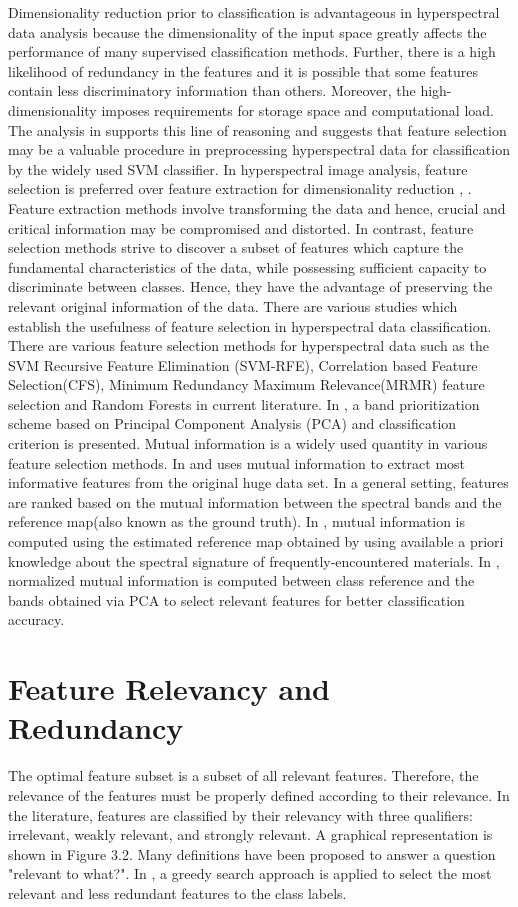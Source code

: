 \documentclass[document.tex]{subfiles}
\begin{document}
Dimensionality reduction prior to classification is advantageous in hyperspectral data
analysis because the dimensionality of the input space greatly affects the performance of
many supervised classification methods\cite{13}. Further, there is a high likelihood of redundancy in the features and it is possible that some features contain less discriminatory
information than others. Moreover, the high-dimensionality imposes requirements for
storage space and computational load. The analysis in \cite{1} supports this line of reasoning
and suggests that feature selection may be a valuable procedure in preprocessing hyperspectral data for classification by the widely used SVM classifier. In hyperspectral
image analysis, feature selection is preferred over feature extraction for dimensionality
reduction \cite{4}, \cite{13}. Feature extraction methods involve transforming the data and hence,
crucial and critical information may be compromised and distorted. In contrast, feature
selection methods strive to discover a subset of features which capture the fundamental
characteristics of the data, while possessing sufficient capacity to discriminate between
classes. Hence, they have the advantage of preserving the relevant original information of
the data. There are various studies which establish the usefulness of feature selection in
hyperspectral data classification. There are various feature selection methods for hyperspectral data such as the SVM Recursive Feature Elimination (SVM-RFE), Correlation
based Feature Selection(CFS), Minimum Redundancy Maximum Relevance(MRMR)
\cite{14} feature selection and Random Forests\cite{15} in current literature. In \cite{5}, a band prioritization scheme based
on Principal Component Analysis (PCA) and classification criterion is presented. Mutual
information is a widely used quantity in various feature selection methods. In \cite{16} and \cite{17} uses mutual information to extract most informative features from the original huge data set. In a general
setting, features are ranked based on the mutual information between the spectral bands
and the reference map(also known as the ground truth). In \cite{10}, mutual information is
computed using the estimated reference map obtained by using available a priori knowledge about the spectral signature of frequently-encountered materials. In \cite{9}, normalized mutual information is computed between class reference and the bands obtained via PCA to select relevant features for better classification accuracy.  

\section{Feature Relevancy and Redundancy}
The optimal feature subset is a subset of all relevant features. Therefore, the relevance
of the features must be properly defined according to their relevance. In the literature,
features are classified by their relevancy with three qualifiers: irrelevant, weakly relevant,
and strongly relevant. A graphical representation is shown in Figure 3.2. Many definitions
have been proposed to answer a question "relevant to what?". In \cite{9}, a greedy search approach is applied to select the most relevant and less redundant features to the class labels. 
\end{document}
